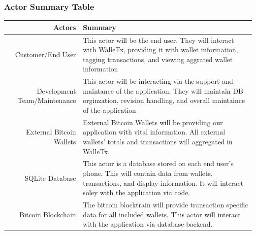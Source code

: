     \subsubsection{Actor Summary Table}
    \begin{table}[H]
      \begin{tabularx}{\textwidth}{r | X}
        Actors                       & Summary\\
        \hline
        Customer/End User            & This actor will be the end user.  They will interact with WalleTx,  providing it with wallet information, tagging transactions, and viewing  aggrated wallet information\\
        Development Team/Maintenance & This actor will be interacting via the support and maintance of the  application.  They will maintain DB orginzation, revision handling, and  overall maintaince of the application\\
        External Bitcoin Wallets     & External Bitcoin Wallets will be providing our application with vital  information.  All external wallets' totals and transactions will  aggregated in WalleTx.\\
        SQLite Database              & This actor is a database stored on each end user's phone. This will  contain data from wallets, transactions, and display information.  It  will interact soley with the application via code.\\
        Bitcoin Blockchain           & The bitcoin blocktrain will provide transaction specific data for all  included wallets. This actor will interact with the application via  database backend.\\
      \end{tabularx}
    \end{table}

